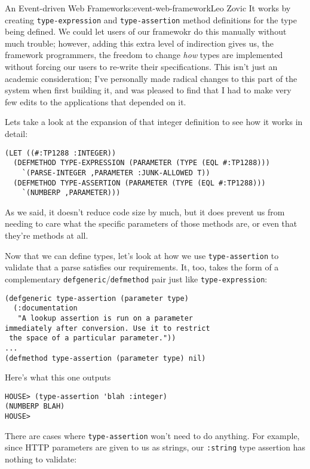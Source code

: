 \begin{aosachapter}{An Event-driven Web Framework}{s:event-web-framework}{Leo Zovic}
It works by creating \texttt{type-expression} and
\texttt{type-assertion} method definitions for the type being defined.
We could let users of our framewokr do this manually without much
trouble; however, adding this extra level of indirection gives us, the
framework programmers, the freedom to change \emph{how} types are
implemented without forcing our users to re-write their specifications.
This isn't just an academic consideration; I've personally made radical
changes to this part of the system when first building it, and was
pleased to find that I had to make very few edits to the applications
that depended on it.

Lets take a look at the expansion of that integer definition to see how
it works in detail:

\begin{verbatim}
(LET ((#:TP1288 :INTEGER))
  (DEFMETHOD TYPE-EXPRESSION (PARAMETER (TYPE (EQL #:TP1288)))
    `(PARSE-INTEGER ,PARAMETER :JUNK-ALLOWED T))
  (DEFMETHOD TYPE-ASSERTION (PARAMETER (TYPE (EQL #:TP1288)))
    `(NUMBERP ,PARAMETER)))
\end{verbatim}

As we said, it doesn't reduce code size by much, but it does prevent us
from needing to care what the specific parameters of those methods are,
or even that they're methods at all.

\label{type-assertion}

Now that we can define types, let's look at how we use
\texttt{type-assertion} to validate that a parse satisfies our
requirements. It, too, takes the form of a complementary
\texttt{defgeneric}/\texttt{defmethod} pair just like
\texttt{type-expression}:

\begin{verbatim}
(defgeneric type-assertion (parameter type)
  (:documentation
   "A lookup assertion is run on a parameter
immediately after conversion. Use it to restrict
 the space of a particular parameter."))
...
(defmethod type-assertion (parameter type) nil)
\end{verbatim}

Here's what this one outputs

\begin{verbatim}
HOUSE> (type-assertion 'blah :integer)
(NUMBERP BLAH)
HOUSE>
\end{verbatim}

There are cases where \texttt{type-assertion} won't need to do anything.
For example, since HTTP parameters are given to us as strings, our
\texttt{:string} type assertion has nothing to validate:


\end{aosachapter}
